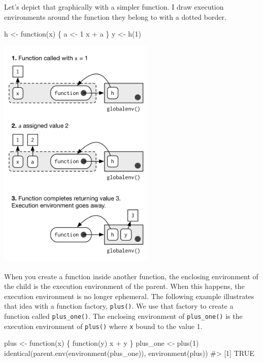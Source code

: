 \documentclass[oneside]{book}
\newenvironment{Shaded}{}{}
\newcommand{\KeywordTok} [1]{\textcolor[rgb]{0.00,0.44,0.13}{{#1}}}
\newcommand{\DecValTok}  [1]{\textcolor[rgb]{0.25,0.63,0.44}{{#1}}}
\newcommand{\StringTok}  [1]{\textcolor[rgb]{0.25,0.44,0.63}{{#1}}}
\newcommand{\CommentTok} [1]{\textcolor[rgb]{0.38,0.63,0.69}{{#1}}}
\newcommand{\NormalTok}  [1]{{#1}}
\begin{document}
Let's depict that graphically with a simpler function. I draw execution
environments around the function they belong to with a dotted border.

\begin{Shaded}
\begin{Highlighting}[]
\NormalTok{h <-}\StringTok{ }\NormalTok{function(x) \{}
  \NormalTok{a <-}\StringTok{ }\DecValTok{1}
  \NormalTok{x +}\StringTok{ }\NormalTok{a}
\NormalTok{\}}
\NormalTok{y <-}\StringTok{ }\KeywordTok{h}\NormalTok{(}\DecValTok{1}\NormalTok{)}
\end{Highlighting}
\end{Shaded}

\includegraphics[width=2.95in,height=4.43in]{diagrams/environments.png/execution.png}

When you create a function inside another function, the enclosing
environment of the child is the execution environment of the parent.
When this happens, the execution environment is no longer ephemeral. The
following example illustrates that idea with a function factory,
\texttt{plus()}. We use that factory to create a function called
\texttt{plus\_one()}. The enclosing environment of \texttt{plus\_one()}
is the execution environment of \texttt{plus()} where \texttt{x} bound
to the value 1.

\begin{Shaded}
\begin{Highlighting}[]
\NormalTok{plus <-}\StringTok{ }\NormalTok{function(x) \{}
  \NormalTok{function(y) x +}\StringTok{ }\NormalTok{y}
\NormalTok{\}}
\NormalTok{plus_one <-}\StringTok{ }\KeywordTok{plus}\NormalTok{(}\DecValTok{1}\NormalTok{)}
\KeywordTok{identical}\NormalTok{(}\KeywordTok{parent.env}\NormalTok{(}\KeywordTok{environment}\NormalTok{(plus_one)), }\KeywordTok{environment}\NormalTok{(plus))}
\CommentTok{#> [1] TRUE}
\end{Highlighting}
\end{Shaded}
\end{document}

